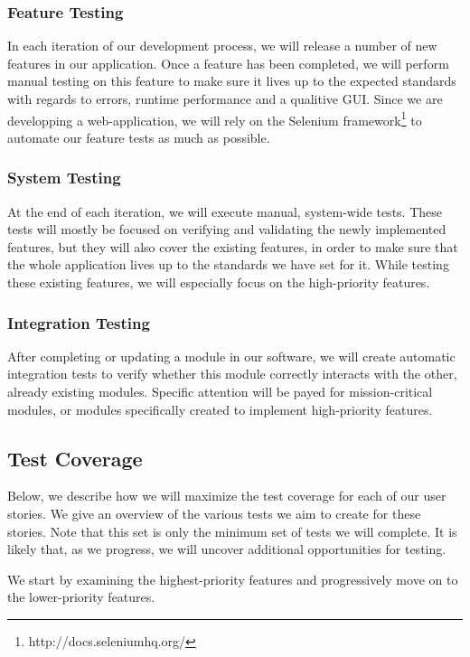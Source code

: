 \documentclass {article}
\begin{document}
\subsubsection*{Feature Testing}
In each iteration of our development process, we will release a number of new features in our application. Once a feature has been completed, we will perform manual testing on this feature to make sure it lives up to the expected standards with regards to errors, runtime performance and a qualitive GUI.
Since we are developping a web-application, we will rely on the Selenium framework\footnote{http://docs.seleniumhq.org/} to automate our feature tests as much as possible.

\subsubsection*{System Testing}
At the end of each iteration, we will execute manual, system-wide tests. These tests will mostly be focused on verifying and validating the newly implemented features, but they will also cover the existing features, in order to make sure that the whole application lives up to the standards we have set for it.
While testing these existing features, we will especially focus on the high-priority features.

\subsubsection*{Integration Testing}
After completing or updating a module in our software, we will create automatic integration tests to verify whether this module correctly interacts with the other, already existing modules. Specific attention will be payed for mission-critical modules, or modules specifically created to implement high-priority features.

\subsection{Test Coverage}
Below, we describe how we will maximize the test coverage for each of our user stories. We give an overview of the various tests we aim to create for these stories.
Note that this set is only the minimum set of tests we will complete. It is likely that, as we progress, we will uncover additional opportunities for testing.

We start by examining the highest-priority features and progressively move on to the lower-priority features.
\end{document}
